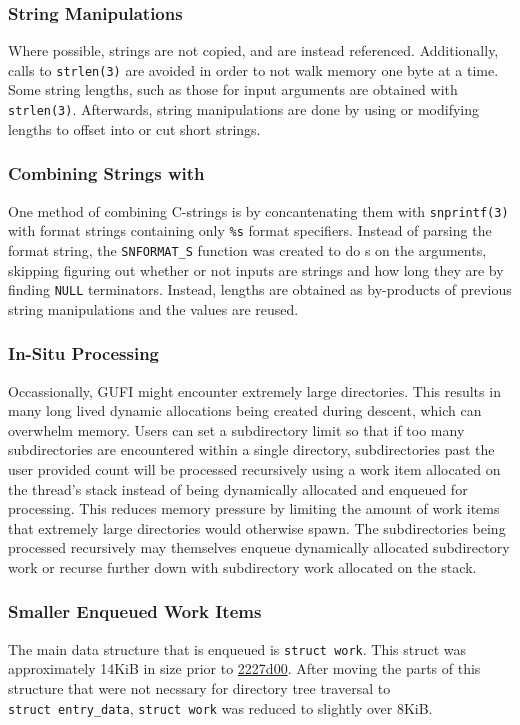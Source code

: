 \subsubsection{String Manipulations}
Where possible, strings are not copied, and are instead referenced.
Additionally, calls to \texttt{strlen(3)} are avoided in order to not
walk memory one byte at a time. Some string lengths, such as those for
input arguments are obtained with \texttt{strlen(3)}. Afterwards,
string manipulations are done by using or modifying lengths to offset
into or cut short strings.

\subsubsection{Combining Strings with \memcpy}
One method of combining C-strings is by concantenating them with
\texttt{snprintf(3)} with format strings containing only \texttt{\%s}
format specifiers. Instead of parsing the format string, the
\texttt{SNFORMAT\_S} function was created to do \memcpy s on the
arguments, skipping figuring out whether or not inputs are strings and
how long they are by finding \texttt{NULL} terminators. Instead,
lengths are obtained as by-products of previous string manipulations
and the values are reused.

\subsubsection{In-Situ Processing}
Occassionally, GUFI might encounter extremely large directories. This
results in many long lived dynamic allocations being created during
descent, which can overwhelm memory. Users can set a subdirectory
limit so that if too many subdirectories are encountered within a
single directory, subdirectories past the user provided count will be
processed recursively using a work item allocated on the thread's
stack instead of being dynamically allocated and enqueued for
processing. This reduces memory pressure by limiting the amount of
work items that extremely large directories would otherwise spawn. The
subdirectories being processed recursively may themselves enqueue
dynamically allocated subdirectory work or recurse further down with
subdirectory work allocated on the stack.

\subsubsection{Smaller Enqueued Work Items}
The main data structure that is enqueued is \texttt{struct~work}. This
struct was approximately 14KiB in size prior to
\href{https://github.com/mar-file-system/GUFI/commit/2227d00665eb6d507ac2052e80616c077a5da853}{2227d00}. After
moving the parts of this structure that were not necssary for
directory tree traversal to \texttt{struct~entry\_data},
\texttt{struct work} was reduced to slightly over 8KiB.

